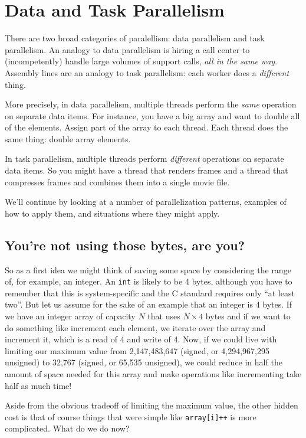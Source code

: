 \documentclass[a4paper]{report}
\begin{document}


\section*{Data and Task Parallelism}
There are two broad categories of paralellism: data parallelism and
task parallelism. An analogy to data parallelism is hiring a call
center to (incompetently) handle large volumes of support calls,
\emph{all in the same way}. Assembly lines are an analogy to task
parallelism: each worker does a \emph{different} thing.

More precisely, in data parallelism, multiple threads perform the
\emph{same} operation on separate data items. For instance, you have a
big array and want to double all of the elements. Assign part of the
array to each thread. Each thread does the same thing: double array
elements.

In task parallelism, multiple threads perform \emph{different}
operations on separate data items. So you might have a thread that
renders frames and a thread that compresses frames and combines them
into a single movie file.

We'll continue by looking at a number of parallelization patterns,
examples of how to apply them, and situations where they might apply.

\subsection*{You're not using those bytes, are you?}
So as a first idea we might think of saving some space by considering the range of, for example, an integer. An \texttt{int} is likely to be 4 bytes, although you have to remember that this is system-specific and the C standard requires only ``at least two''. But let us assume for the sake of an example that an integer is 4 bytes. If we have an integer array of capacity $N$ that uses $N \times 4$ bytes and if we want to do something like increment each element, we iterate over the array and increment it, which is a read of 4 and write of 4. Now, if we could live with limiting our maximum value from 2,147,483,647 (signed, or 4,294,967,295 unsigned) to 32,767  (signed, or 65,535 unsigned), we could reduce in half the amount of space needed for this array and make operations like incrementing take half as much time!

Aside from the obvious tradeoff of limiting the maximum value, the other hidden cost is that of course things that were simple like \texttt{array[i]++} is more complicated. What do we do now?
\end{document}
